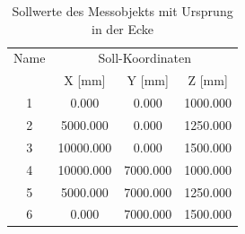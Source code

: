 \begin{table}[h]\label{tab:sollwerteecke}
\centering
\caption{Sollwerte des Messobjekts mit Ursprung in der Ecke}

\begin{tabular}{cccc}
\toprule
\multicolumn{1}{c|}{Name} &
\multicolumn{3}{c}{Soll-Koordinaten} \\
\multicolumn{1}{c|}{} &
\multicolumn{1}{c|}{X [mm]} &
\multicolumn{1}{c|}{Y [mm]} &
\multicolumn{1}{c}{Z [mm]} \\
\midrule

\multicolumn{1}{c|}{1} &
\multicolumn{1}{c|}{0.000} &
\multicolumn{1}{c|}{0.000} &
\multicolumn{1}{c}{1000.000} \\

\multicolumn{1}{c|}{2} &
\multicolumn{1}{c|}{5000.000} &
\multicolumn{1}{c|}{0.000} &
\multicolumn{1}{c}{1250.000} \\

\multicolumn{1}{c|}{3} &
\multicolumn{1}{c|}{10000.000} &
\multicolumn{1}{c|}{0.000} &
\multicolumn{1}{c}{1500.000} \\

\multicolumn{1}{c|}{4} &
\multicolumn{1}{c|}{10000.000} &
\multicolumn{1}{c|}{7000.000} &
\multicolumn{1}{c}{1000.000} \\

\multicolumn{1}{c|}{5} &
\multicolumn{1}{c|}{5000.000} &
\multicolumn{1}{c|}{7000.000} &
\multicolumn{1}{c}{1250.000} \\

\multicolumn{1}{c|}{6} &
\multicolumn{1}{c|}{0.000} &
\multicolumn{1}{c|}{7000.000} &
\multicolumn{1}{c}{1500.000} \\
\bottomrule
\end{tabular}
\end{table}


